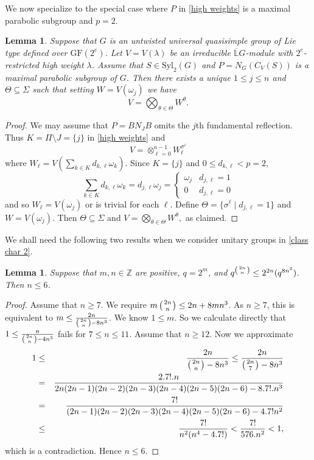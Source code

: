 \documentclass[12pt]{amsart}
\newtheorem{lemma}[theorem]{Lemma}
\theoremstyle{remark}
\theoremstyle{notation}
\theoremstyle{definition}
\newcommand{\Syl}{\mathrm{Syl}}\newcommand{\syl}{\mathrm{Syl}}
\newcommand{\GF}{\mathrm{GF}}
\newcommand{\0}{\emptyset}
\begin{document}
We now specialize to the special case where $P$ in \cref{high weights} is a maximal parabolic subgroup and $p=2$.

\begin{lemma}\label{high weight app} Suppose that $G$  is an untwisted universal quasisimple group of Lie type defined over $\GF(2^e)$. Let $V=V(\lambda)$ be an irreducible $\overline{\mathbb L}G$-module with $2^e$-restricted high weight $\lambda$. Assume that  $S \in \Syl_2(G)$  and $P= N_G(C_V(S))$ is a maximal parabolic subgroup of $G$. Then there exists a unique $1 \le j\le n$ and $\Theta \subseteq \Sigma$ such that setting $W= V(\omega_j)$ we have
$$V= \bigotimes_{\theta \in \Theta} W^\theta.$$
\end{lemma}
\begin{proof} We may assume that $P=BN_JB$ omits the $j$th fundamental reflection.  Thus $K=\Pi\setminus J=\{j\}$ in \cref{high weights} and
 $$ V=    \otimes_{\ell=0}^{a-1} W_\ell^{\sigma^{ \ell}}$$ where $W_\ell= V\left(\sum_{k\in K} d_{k,\ell}\omega_k\right)$. Since $K=\{j\}$ and $0\le d_{k,\ell}<p=2$, $$\sum_{k\in K} d_{k,\ell}\omega_k= d_{j,\ell}\omega_j=\begin{cases}\omega_j&
 d_{j,\ell}=1 \\0&d_{j,\ell}=0\end{cases}$$ and so $W_\ell=V(\omega_j)$ or is trivial for each $\ell$.
 Define $\Theta=\{\sigma^\ell \mid d_{j,\ell}=1\}$ and $W=V(\omega_j)$.  Then $\Theta \subseteq \Sigma$ and
$ {V}=\bigotimes_{\theta \in \Theta} W^{\theta},$
as claimed.\end{proof}





We shall  need the following two results when we consider unitary groups in \cref{class char 2}.

\begin{lemma}\label{SU2nbound}
Suppose that $m, n \in \mathbb Z$ are positive, $q=2^m$, and $q^{\left({2n}\atop n\right)}  \le 2^{2n} (q^{8n^3}) $. Then $n \le 6$.
\end{lemma}

\begin{proof} Assume that $n \ge 7$. We require $m\left({2n}\atop n\right) \le 2n+8mn^3$. As $n \ge 7$, this is equivalent to $m\le \frac {2n}{  \left({2n}\atop n\right)-8n^3  }$. We know $1\le m$.  So we calculate directly that $1\le \frac n{  \left({2n}\atop n\right)-4n^3  }$ fails for $7\le n \le 11$. Assume that $n \ge 12$.
Now we approximate \begin{eqnarray*}1&\le&\frac {2n}{  \left({2n}\atop n\right)-8n^3  }\le \frac {2n}{  \left({2n}\atop 7\right)-8n^3  }\\&=& \frac{2.7!.n}{2n(2n-1)(2n-2)(2n-3)(2n-4)(2n-5)(2n-6) -8.7!.n^3}\\
&=& \frac{7!}{(2n-1)(2n-2)(2n-3)(2n-4)(2n-5)(2n-6) -4.7!n^2}\\
&\le&\frac{7!}{n^2(n^4-4.7!)}
 < \frac{7!}{576.n^2}<1,\end{eqnarray*} which is a contradiction. Hence $n \le 6$.
\end{proof}
\end{document}
